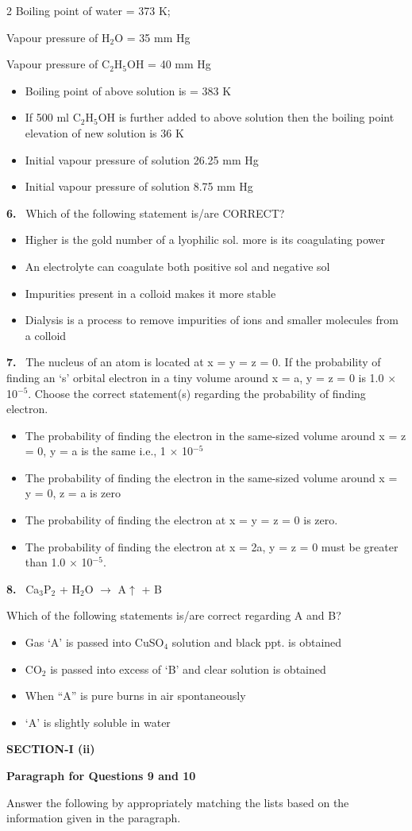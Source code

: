 \documentclass[10pt]{extarticle}
\newcommand{\sect}[1]{\par\smallskip\noindent\textbf{#1}\par}
\newcommand{\qn}[1]{\par\smallskip\noindent\textbf{#1.}~}
\newcommand{\paraq}[2]{\par\smallskip\noindent\textbf{Paragraph for Questions #1 and #2}\par}
\newenvironment{qoptions}{\begin{itemize}[leftmargin=1.8em,itemsep=1pt,topsep=2pt,label={}]}{\end{itemize}}
\newcommand{\opt}[2]{\item[(#1)] #2}
\begin{document}
\begin{multicols}{2}
Boiling point of water = 373 K;\par
Vapour pressure of H$_2$O = 35 mm Hg\par
Vapour pressure of C$_2$H$_5$OH = 40 mm Hg
\begin{qoptions}
\opt{A}{Boiling point of above solution is = 383 K}
\opt{B}{If 500 ml C$_2$H$_5$OH is further added to above solution then the boiling point elevation of new solution is 36 K}
\opt{C}{Initial vapour pressure of solution 26.25 mm Hg}
\opt{D}{Initial vapour pressure of solution 8.75 mm Hg}
\end{qoptions}
\qn{6} Which of the following statement is/are CORRECT?
\begin{qoptions}
\opt{A}{Higher is the gold number of a lyophilic sol. more is its coagulating power}
\opt{B}{An electrolyte can coagulate both positive sol and negative sol}
\opt{C}{Impurities present in a colloid makes it more stable}
\opt{D}{Dialysis is a process to remove impurities of ions and smaller molecules from a colloid}
\end{qoptions}
\qn{7} The nucleus of an atom is located at x = y = z = 0. If the probability of finding an `s' orbital electron in a tiny volume around x = a, y = z = 0 is 1.0 $\times$ 10$^{-5}$. Choose the correct statement(s) regarding the probability of finding electron.
\begin{qoptions}
\opt{A}{The probability of finding the electron in the same-sized volume around x = z = 0, y = a is the same i.e., 1 $\times$ 10$^{-5}$}
\opt{B}{The probability of finding the electron in the same-sized volume around x = y = 0, z = a is zero}
\opt{C}{The probability of finding the electron at x = y = z = 0 is zero.}
\opt{D}{The probability of finding the electron at x = 2a, y = z = 0 must be greater than 1.0 $\times$ 10$^{-5}$.}
\end{qoptions}
\qn{8} Ca$_3$P$_2$ + H$_2$O $\longrightarrow$ A$\uparrow$ + B\par
Which of the following statements is/are correct regarding A and B?
\begin{qoptions}
\opt{A}{Gas `A' is passed into CuSO$_4$ solution and black ppt. is obtained}
\opt{B}{CO$_2$ is passed into excess of `B' and clear solution is obtained}
\opt{C}{When ``A'' is pure burns in air spontaneously}
\opt{D}{`A' is slightly soluble in water}
\end{qoptions}
\sect{SECTION-I (ii)}
\paraq{9}{10}Answer the following by appropriately matching the lists based on the information given in the paragraph.\par

\end{multicols}
\end{document}
